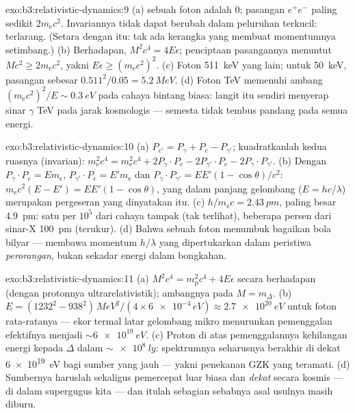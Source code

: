 \begin{solution}{exo:b3:relativistic-dynamics:9}
(a)  sebuah foton adalah $0$;  pasangan
$e^+e^-$ paling sedikit $2m_{\text{e}}c^2$. Invariannya tidak dapat
berubah dalam peluruhan terkucil: terlarang. (Setara dengan itu: tak ada
kerangka yang membuat momentumnya setimbang.) (b)
Berhadapan, $M^2c^4 = 4E\epsilon$; penciptaan pasangannya menuntut $Mc^2 \ge
2m_{\text{e}}c^2$, yakni $E\epsilon \ge (m_{\text{e}}c^2)^2$. (c)
Foton \qty{511}{keV} yang lain; untuk \qty{50}{keV}, pasangan sebesar
$0.511^2/0.05 = \qty{5.2}{MeV}$. (d) Foton TeV memenuhi ambang
$(m_{\text{e}}c^2)^2/E \sim \qty{0.3}{eV}$ pada cahaya bintang biasa:
langit itu sendiri menyerap sinar $\gamma$ TeV pada jarak kosmologis ---
semesta tidak tembus pandang pada semua energi.
\end{solution}

\begin{solution}{exo:b3:relativistic-dynamics:10}
(a) $P_{e'} = P_\gamma + P_e - P_{\gamma'}$; kuadratkanlah kedua ruasnya
(invarian): $m_{\text{e}}^2c^4 = m_{\text{e}}^2c^4 + 2P_\gamma\!
\cdot\!P_e - 2P_{\gamma'}\!\cdot\!P_e - 2P_\gamma\!\cdot\!P_{\gamma'}$.
(b) Dengan $P_\gamma\!\cdot\!P_e = E m_{\text{e}}$,
$P_{\gamma'}\!\cdot\!P_e = E'm_{\text{e}}$ dan $P_\gamma\!\cdot\!
P_{\gamma'} = EE'(1 - \cos\theta)/c^2$:
$m_{\text{e}}c^2(E - E') = EE'(1 - \cos\theta)$, yang dalam panjang
gelombang ($E = hc/\lambda$) merupakan pergeseran yang dinyatakan itu.
(c) $h/m_{\text{e}}c =
\qty{2.43}{pm}$, paling besar \qty{4.9}{pm}:
satu per $10^5$ dari cahaya tampak (tak terlihat), beberapa persen dari
sinar-X \qty{100}{pm} (terukur). (d) Bahwa sebuah foton menumbuk
bagaikan bola bilyar --- membawa momentum $h/\lambda$ yang dipertukarkan
dalam peristiwa \emph{perorangan}, bukan sekadar energi dalam bongkahan.
\end{solution}

\begin{solution}{exo:b3:relativistic-dynamics:11}
(a) $M^2c^4 = m_{\text{p}}^2c^4 + 4E\epsilon$ secara berhadapan (dengan
protonnya ultrarelativistik); ambangnya pada $M = m_\Delta$. (b) $E =
(1232^2 - 938^2)\,\unit{MeV^2}/(4 \times \num{6e-4}\,\unit{eV})
\approx \qty{2.7e20}{eV}$ untuk foton rata-ratanya --- ekor termal
latar gelombang mikro menurunkan pemenggalan efektifnya menjadi
$\sim\qty{6e19}{eV}$. (c) Proton di atas pemenggalannya kehilangan
energi kepada $\Delta$ dalam $\sim\qty{e8}{ly}$: spektrumnya seharusnya
berakhir di dekat \qty{6e19}{eV} bagi sumber yang jauh --- yakni
penekanan GZK yang teramati.
(d) Sumbernya haruslah sekaligus pemercepat luar biasa dan \emph{dekat}
secara kosmis --- di dalam supergugus kita --- dan itulah sebagian
sebabnya asal usulnya masih diburu.
\end{solution}

